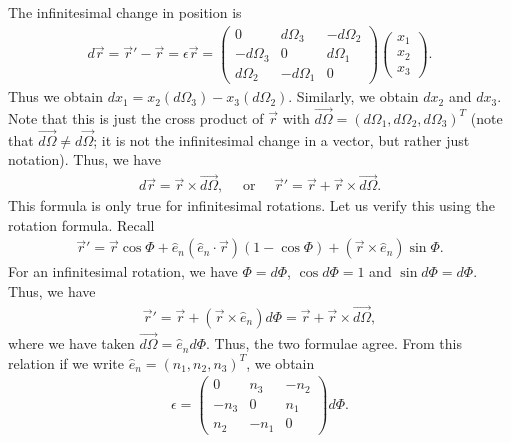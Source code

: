 The infinitesimal change in position is
\begin{align}
    d\vec{r} = \vec{r}' - \vec{r} = \epsilon \vec{r} = \begin{pmatrix}
        0 & d\Omega_{3} & -d\Omega_{2} \\
        -d\Omega_{3} & 0 & d\Omega_{1} \\
        d\Omega_{2} & -d\Omega_{1} & 0
    \end{pmatrix} \begin{pmatrix}
        x_{1} \\ x_{2} \\ x_{3}
    \end{pmatrix}.
\end{align}
Thus we obtain $dx_{1} = x_{2}(d\Omega_{3}) - x_{3}(d\Omega_{2})$. Similarly, we obtain $dx_{2}$ and $dx_{3}$. Note that this is just the cross product of $\vec{r}$ with $\vec{d\Omega} = (d\Omega_{1},d\Omega_{2},d\Omega_{3})^{T}$ (note that $\vec{d\Omega} \neq d\vec{\Omega}$; it is not the infinitesimal change in a vector, but rather just notation). Thus, we have
\begin{align}
    d \vec{r} = \vec{r} \times \vec{d\Omega}, \quad \text{ or } \quad \vec{r}' = \vec{r} + \vec{r} \times \vec{d\Omega}.
\end{align}
This formula is only true for infinitesimal rotations. Let us verify this using the rotation formula. Recall
\begin{align}
    \vec{r}' = \vec{r} \cos \Phi + \hat{e}_{n}(\hat{e}_{n} \cdot \vec{r}) (1-\cos \Phi) + (\vec{r} \times \hat{e}_{n}) \sin \Phi.
\end{align}
For an infinitesimal rotation, we have $\Phi = d\Phi$, $\cos d\Phi = 1$ and $\sin d\Phi = d\Phi$. Thus, we have
\begin{align}
    \vec{r}' = \vec{r} + (\vec{r} \times \hat{e}_{n}) d \Phi = \vec{r} + \vec{r} \times \vec{d\Omega},
\end{align}
where we have taken $\vec{d\Omega} = \hat{e}_{n} d\Phi$. Thus, the two formulae agree. From this relation if we write $\hat{e}_{n} = (n_{1},n_{2},n_{3})^{T}$, we obtain
\begin{align}
    \epsilon = \begin{pmatrix}
        0 & n_{3} & -n_{2} \\
        -n_{3} & 0 & n_{1} \\
        n_{2} & -n_{1} & 0
    \end{pmatrix}d\Phi.
\end{align}